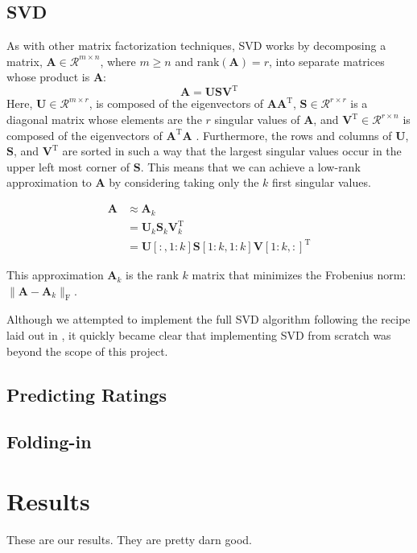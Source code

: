 \documentclass{article} %
\newcommand{\A}{\mathbf{A}}
\newcommand{\T}{\textrm{T}}
\begin{document}
\subsection{SVD}
As with other matrix factorization techniques, SVD works by decomposing a matrix, $\A \in \mathcal{R}^{m \times n}$, where $m \geq n$ and 
$\textrm{rank}(\A) = r$, 
into separate matrices whose product is $\A$:
$$\A = \mathbf{U}\mathbf{S}\mathbf{V}^{\T}$$
Here, $\mathbf{U} \in \mathcal{R}^{m \times r}$, is composed of the eigenvectors of $\A\A^{\T}$, 
$\mathbf{S} \in \mathcal{R}^{r \times r}$ is a diagonal matrix whose elements are the $r$ singular values of $\A$,
and $\mathbf{V}^{\T} \in \mathcal{R}^{r \times n}$ is composed of the
eigenvectors of $\A^{\T}\A$ \cite{golub1970}.
Furthermore, the rows and columns of $\mathbf{U}$, $\mathbf{S}$, and $\mathbf{V}^{\T}$ are sorted in such a way that the largest singular values occur in the upper left most corner of $\mathbf{S}$.
This means that we can achieve a low-rank approximation to $\A$ by considering taking only the $k$ first singular values.

\begin{align*}
	\A &\approx \A_k\\
	&= \mathbf{U}_k\mathbf{S}_k\mathbf{V}_k^{\T}\\
	&= \mathbf{U}[:,1:k]\mathbf{S}[1:k,1:k]\mathbf{V}[1:k,:]^{\T}
\end{align*}

This approximation $\A_k$ is the rank $k$ matrix that minimizes the Frobenius norm: $\|\A - \A_k\|_{\textrm{F}}$.

Although we attempted to implement the full SVD algorithm following the recipe laid out in \cite{recipes2007}, it quickly became clear that implementing SVD from scratch was beyond the scope of this project.

\subsection{Predicting Ratings}

\subsection{Folding-in}

\section{Results}
These are our results. They are pretty darn good.
\end{document}
